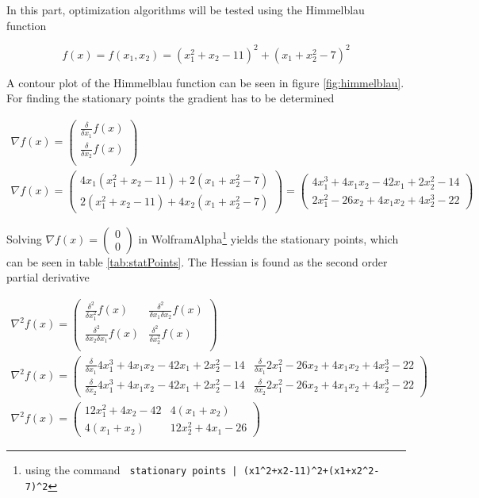 \setlength{\tabcolsep}{4pt}

In this part, optimization algorithms will be tested using the Himmelblau function

\begin{equation}
f(x) = f(x_1, x_2) = (x_1^2 + x_2 - 11)^2 + (x_1 + x_2^2 - 7)^2
\label{eq:himm}
\end{equation}

A contour plot of the Himmelblau function can be seen in figure \ref{fig:himmelblau}. For finding the stationary points the gradient has to be determined

\begin{gather*}
\nabla f(x) = 
\begin{pmatrix}
\frac{\delta}{\delta x_1} f(x) \\
\frac{\delta}{\delta x_2} f(x) \\
\end{pmatrix} \\
\nabla f(x) = 
\begin{pmatrix}
4 x_1 (x_1^2 + x_2 - 11) + 2 (x_1 + x_2^2 - 7) \\
2 (x_1^2 + x_2 - 11) + 4 x_2 (x_1 + x_2^2 - 7)
\end{pmatrix}
= \begin{pmatrix}
4 x_1^3 + 4 x_1 x_2 -42 x_1 + 2 x_2^2 - 14 \\
2 x_1^2 - 26 x_2 + 4 x_1 x_2 + 4 x_2^3 - 22 
\end{pmatrix}
\end{gather*}

Solving $\nabla f(x) = \left(\begin{smallmatrix}0\\0\end{smallmatrix}\right)$ in WolframAlpha\footnote{using the command \verb: stationary points | (x1^2+x2-11)^2+(x1+x2^2-7)^2:} yields the stationary points, which can be seen in table \ref{tab:statPoints}. The Hessian is found as the second order partial derivative

\begin{gather*}
\nabla^2 f(x) = 
\begin{pmatrix}
\frac{\delta^2}{\delta x_1^2} f(x) 			& \frac{\delta^2}{\delta x_1 \delta x_2} f(x) \\
\frac{\delta^2}{\delta x_2 \delta x_1} f(x) 	& \frac{\delta^2}{\delta x_2^2} f(x) \\
\end{pmatrix} \\
\nabla^2 f(x) = 
\begin{pmatrix}
\frac{\delta}{\delta x_1} 4 x_1^3 + 4 x_1 x_2 -42 x_1 + 2 x_2^2 - 14 		& \frac{\delta}{\delta x_1} 2 x_1^2 - 26 x_2 + 4 x_1 x_2 + 4 x_2^3 - 22 \\
\frac{\delta}{\delta x_2} 4 x_1^3 + 4 x_1 x_2 -42 x_1 + 2 x_2^2 - 14 		& \frac{\delta}{\delta x_2} 2 x_1^2 - 26 x_2 + 4 x_1 x_2 + 4 x_2^3 - 22
\end{pmatrix} \\
\nabla^2 f(x) = 
\begin{pmatrix}
12 x_1^2 + 4 x_2 - 42		& 4 (x_1 + x_2) \\
4 (x_1 + x_2) 				& 12 x_2^2 + 4 x_1 - 26 
\end{pmatrix}
\end{gather*}

